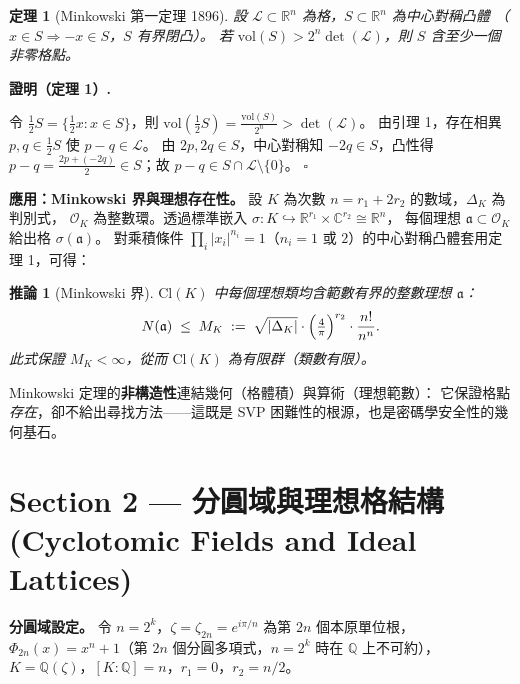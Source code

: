 \documentclass[10.5pt, a4paper]{article}
\theoremstyle{cpt}
\newtheorem{theorem}{定理}
\newtheorem{corollary}{推論}
\newenvironment{proofbox}[1][證明]{%
  \begin{tcolorbox}[colback=thmfill, colframe=accent!40,
    breakable, left=5pt, right=5pt, top=3pt, bottom=3pt, boxrule=0.4pt]
  \noindent\textbf{\color{accent}#1.}\quad\small
}{%
  \hfill$\square$\end{tcolorbox}\vspace{-1pt}
}
\begin{document}
\begin{theorem}[Minkowski 第一定理 1896]
  設 $\mathcal{L}\subset\mathbb{R}^n$ 為格，$S\subset\mathbb{R}^n$ 為中心對稱凸體
  （$x\in S\Rightarrow{-x}\in S$，$S$ 有界閉凸）。
  若 $\mathrm{vol}(S)>2^n\det(\mathcal{L})$，則 $S$ 含至少一個非零格點。
\end{theorem}

\begin{proofbox}[證明（定理 1）]
  令 $\tfrac{1}{2}S=\{\tfrac{1}{2}x:x\in S\}$，則
  $\mathrm{vol}(\tfrac{1}{2}S)=\tfrac{\mathrm{vol}(S)}{2^n}>\det(\mathcal{L})$。
  由引理 1，存在相異 $p,q\in\tfrac{1}{2}S$ 使 $p-q\in\mathcal{L}$。
  由 $2p,2q\in S$，中心對稱知 $-2q\in S$，凸性得
  $p-q=\tfrac{2p+(-2q)}{2}\in S$；故 $p-q\in S\cap\mathcal{L}\setminus\{0\}$。
\end{proofbox}

\textbf{應用：Minkowski 界與理想存在性。}
設 $K$ 為次數 $n=r_1+2r_2$ 的數域，$\Delta_K$ 為判別式，
$\mathcal{O}_K$ 為整數環。透過標準嵌入 $\sigma:K\hookrightarrow\mathbb{R}^{r_1}\times\mathbb{C}^{r_2}\cong\mathbb{R}^n$，
每個理想 $\mathfrak{a}\subset\mathcal{O}_K$ 給出格 $\sigma(\mathfrak{a})$。
對乘積條件 $\prod_i|x_i|^{n_i}=1$（$n_i=1$ 或 $2$）的中心對稱凸體套用定理 1，可得：

\begin{corollary}[Minkowski 界]
  $\mathrm{Cl}(K)$ 中每個理想類均含範數有界的整數理想 $\mathfrak{a}$：
  \[
    N(\mathfrak{a})\;\leq\;
    M_K\;:=\;\sqrt{|\Delta_K|}\cdot
    \Bigl(\tfrac{4}{\pi}\Bigr)^{r_2}\cdot\frac{n!}{n^n}.
  \]
  此式保證 $M_K<\infty$，從而 $\mathrm{Cl}(K)$ 為有限群（類數有限）。
\end{corollary}

Minkowski 定理的\textbf{非構造性}連結幾何（格體積）與算術（理想範數）：
它保證格點\emph{存在}，卻不給出尋找方法——這既是 SVP 困難性的根源，也是密碼學安全性的幾何基石。

\section{Section 2 \;—\; 分圓域與理想格結構
  \textnormal{\small\color{gray}(Cyclotomic Fields and Ideal Lattices)}}

\textbf{分圓域設定。}
令 $n=2^k$，$\zeta=\zeta_{2n}=e^{i\pi/n}$ 為第 $2n$ 個本原單位根，
$\Phi_{2n}(x)=x^n+1$（第 $2n$ 個分圓多項式，$n=2^k$ 時在 $\mathbb{Q}$ 上不可約），
$K=\mathbb{Q}(\zeta)$，$[K:\mathbb{Q}]=n$，$r_1=0$，$r_2=n/2$。
\end{document}
